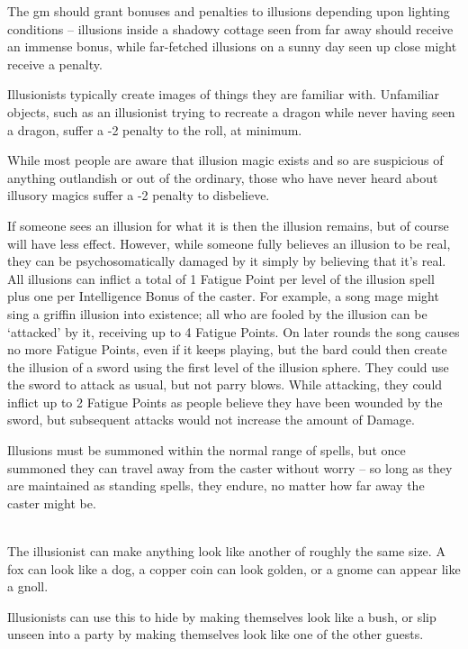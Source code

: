 \documentclass[titlepage,a4paper,openany]{book}
\begin{document}
\begin{multicols}{2}
The \gls{gm} should grant bonuses and penalties to illusions depending upon lighting conditions -- illusions inside a shadowy cottage seen from far away should receive an immense bonus, while far-fetched illusions on a sunny day seen up close might receive a penalty.

Illusionists typically create images of things they are familiar with. Unfamiliar objects, such as an illusionist trying to recreate a dragon while never having seen a dragon, suffer a -2 penalty to the roll, at minimum.

While most people are aware that illusion magic exists and so are suspicious of anything outlandish or out of the ordinary, those who have never heard about illusory magics suffer a -2 penalty to disbelieve.

If someone sees an illusion for what it is then the illusion remains, but of course will have less effect. However, while someone fully believes an illusion to be real, they can be psychosomatically damaged by it simply by believing that it's real. All illusions can inflict a total of 1 Fatigue Point per level of the illusion spell plus one per Intelligence Bonus of the caster. For example, a song mage might sing a griffin illusion into existence; all who are fooled by the illusion can be `attacked' by it, receiving up to 4 Fatigue Points. On later \glspl{round} the song causes no more Fatigue Points, even if it keeps playing, but the bard could then create the illusion of a sword using the first level of the illusion sphere. They could use the sword to attack as usual, but not parry blows. While attacking, they could inflict up to 2 Fatigue Points as people believe they have been wounded by the sword, but subsequent attacks would not increase the amount of Damage.

Illusions must be summoned within the normal range of spells, but once summoned they can travel away from the caster without worry -- so long as they are maintained as standing spells, they endure, no matter how far away the caster might be.

\spelllevel

\\
The illusionist can make anything look like another of roughly the same size.  A fox can look like a dog, a copper coin can look golden, or a gnome can appear like a gnoll.

Illusionists can use this to hide by making themselves look like a bush, or slip unseen into a party by making themselves look like one of the other guests.


\end{multicols}
\end{document}
